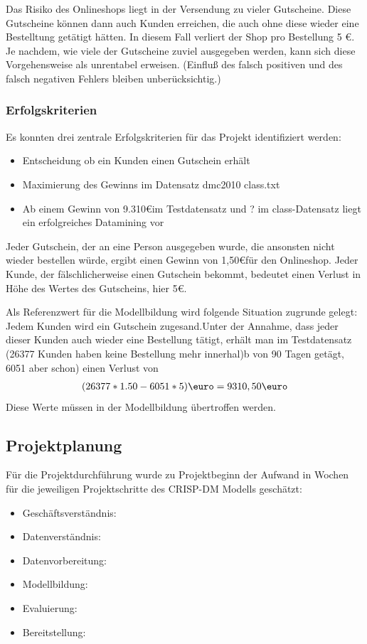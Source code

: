 \documentclass[a4paper,12pt]{article}
\begin{document}
Das Risiko des Onlineshops liegt in der Versendung zu vieler Gutscheine. Diese Gutscheine können dann auch Kunden erreichen, die auch ohne diese wieder eine Bestelltung getätigt hätten. In diesem Fall verliert der Shop pro Bestellung 5 \euro. Je nachdem, wie viele der Gutscheine zuviel ausgegeben werden, kann
sich diese Vorgehensweise als unrentabel erweisen. (Einfluß des falsch positiven und des falsch negativen Fehlers bleiben unberücksichtig.)

\subsubsection{Erfolgskriterien}
Es konnten drei zentrale Erfolgskriterien für das Projekt identifiziert werden:
\begin{itemize}
	\item Entscheidung ob ein Kunden einen Gutschein erhält
	\item Maximierung des Gewinns im Datensatz dmc2010 class.txt
	\item Ab einem Gewinn von 9.310\euro im Testdatensatz und ? im class-Datensatz liegt ein erfolgreiches Datamining vor
\end{itemize}

Jeder Gutschein, der an eine Person ausgegeben wurde, die ansonsten nicht wieder bestellen
würde, ergibt einen Gewinn von 1,50\euro für den Onlineshop. Jeder Kunde, der fälschlicherweise
einen Gutschein bekommt, bedeutet einen Verlust in  Höhe des Wertes des Gutscheins, hier 5\euro.

Als Referenzwert für die Modellbildung wird folgende Situation
zugrunde gelegt: Jedem Kunden wird ein Gutschein zugesand.Unter der Annahme, dass jeder dieser Kunden auch wieder eine Bestellung tätigt, erhält man im Testdatensatz (26377 Kunden haben keine Bestellung mehr innerhal)b von 90 Tagen getägt, 6051 aber schon) einen Verlust von
\begin{align*}
(26377 *1.50 - 6051*5)\text{\euro} = 9310,50 \text{\euro}
\end{align*}
Diese Werte müssen in der Modellbildung übertroffen werden.

\subsection{Projektplanung}
Für die Projektdurchführung wurde zu Projektbeginn der Aufwand in
Wochen für die jeweiligen Projektschritte des CRISP-DM Modells geschätzt:
\begin{itemize}
	\item Geschäftsverständnis:
	\item Datenverständnis:
	\item Datenvorbereitung:
	\item Modellbildung:
	\item Evaluierung:
	\item Bereitstellung:
\end{itemize}
\end{document}
